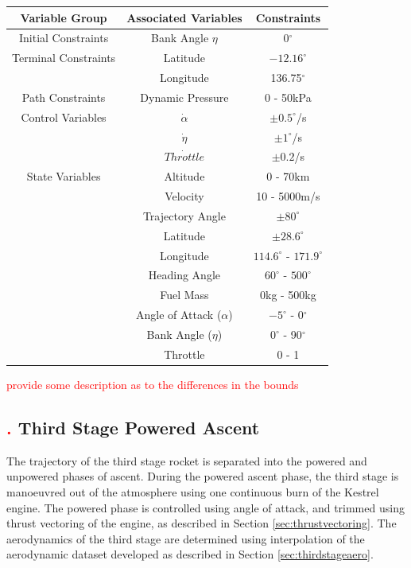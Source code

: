 \begin{table}[ht]
	\centering
\begin{tabular}{|c|c|c|}
	\hline \textbf{Variable Group}  & \textbf{Associated Variables} & \textbf{Constraints}\\
	\hline Initial Constraints  & Bank Angle $\eta$& 0$^\circ$ \\ 
	\hline Terminal Constraints& Latitude & $-12.16^\circ$ \\& Longitude & 136.75$^\circ$\\
	\hline Path Constraints & Dynamic Pressure& 0 - 50kPa\\ 
				\hline Control Variables & $\dot{\alpha}$ &  $\pm0.5^\circ$/s\\  & $\dot{\eta}$ &  $\pm1^\circ$/s\\ & $\dot{Throttle}$& $\pm0.2$/s\\
				\hline State Variables& Altitude & 0 - 70km\\ & Velocity& 10 - 5000m/s\\ & Trajectory Angle& $\pm80^\circ$\\    & Latitude&$\pm28.6^\circ$ \\  & Longitude& $114.6^\circ$ - $171.9^\circ$\\   & Heading Angle& $60^\circ$ - $500^\circ$ \\  & Fuel Mass& 0kg - 500kg\\  & Angle of Attack ($\alpha$)&  $-5^\circ$ - 0$^\circ$\\  & Bank Angle ($\eta$)& $0^\circ$ - 90$^\circ$\\  & Throttle & 0 - 1 \\ 
	\hline 
\end{tabular} 

\end{table}

\textcolor{red}{provide some description as to the differences in the bounds}

\subsection{\textcolor{red}{.} Third Stage Powered Ascent}
The trajectory of the third stage rocket is separated into the powered and unpowered phases of ascent.
During the powered ascent phase, the third stage is manoeuvred out of the atmosphere using one continuous burn of the Kestrel engine. 
 The powered phase is controlled using angle of attack, and trimmed using thrust vectoring of the engine, as described in Section \ref{sec:thrustvectoring}. The aerodynamics of the third stage are determined using interpolation of the aerodynamic dataset developed as described in Section \ref{sec:thirdstageaero}.

